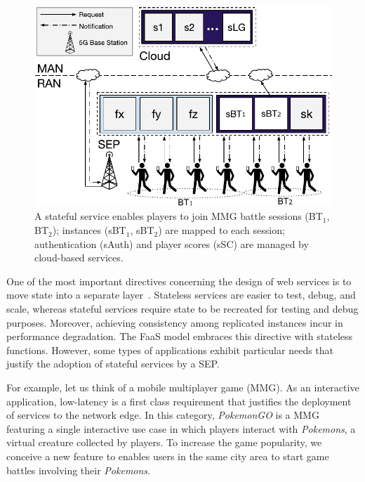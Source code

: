 \begin{figure}[bp]
	\centering
	\includegraphics[width=1\linewidth]{Figs/Stateful_Edge_Services_MMG.pdf}
	\caption{A stateful service enables players to join MMG battle sessions (BT$_1$, BT$_2$); instances (sBT$_1$, sBT$_2$) are mapped to each session; authentication (sAuth) and player scores (sSC) are managed by cloud-based services.}
	\label{fig:Steteful_Edge_MMG}
\end{figure}

One of the most important directives concerning the design of web services is to move state into a separate layer~\cite{Armbrust:2010}. Stateless services are easier to test, debug, and scale, whereas stateful services require state to be recreated for testing and debug purposes. Moreover, achieving consistency among replicated instances incur in performance degradation. The FaaS model embraces this directive with stateless functions.
However, some types of applications exhibit particular needs that justify the adoption of stateful services by a SEP.

For example, let us think of a mobile multiplayer game (MMG). As an interactive application, low-latency is a first class requirement that justifies the deployment of services to the network edge. In this category, \textit{PokemonGO} is 
a MMG featuring a single interactive use case in which players interact with \textit{Pokemons}, a virtual creature collected by players.
To increase the game popularity, we conceive a new feature to enables users in the same city area to start game battles involving their \textit{Pokemons}. 

